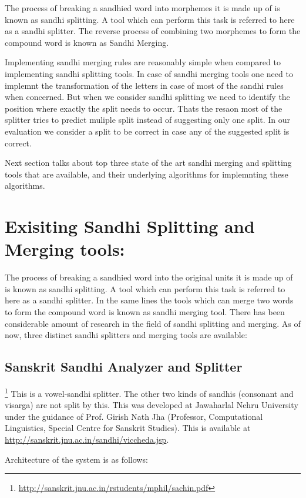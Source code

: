 \documentclass[11pt]{article}
\begin{document}
The process of breaking a sandhied word into morphemes it is made up of is known as sandhi splitting. A tool which can perform this task is referred to here as a sandhi splitter. The reverse process of combining two morphemes to form the compound word is known as Sandhi Merging.

Implementing sandhi merging rules are reasonably simple when compared to implementing sandhi splitting tools. In case of sandhi merging tools one need to implemnt the transformation of the letters in case of most of the sandhi rules when concerned. But when we consider sandhi splitting we need to identify the position where exactly the split needs to occur. Thats the resaon most of the splitter tries to predict muliple split instead of suggesting only one split. In our evaluation we consider a split to be correct in case any of the suggested split is correct.

Next section talks about top three state of the art sandhi merging and splitting tools that are available, and their underlying algorithms for implemnting these algorithms.

\section{Exisiting Sandhi Splitting and Merging tools:}
The process of breaking a sandhied word into the original units it is made up of is known as sandhi splitting. A tool which can perform this task is referred to here as a sandhi splitter.  In the same lines the tools which can merge two words to form the compound word is known as sandhi merging tool. 
There has been considerable amount of research in the field of sandhi splitting and merging. As of now, three distinct sandhi splitters and merging tools are available:



\subsection{Sanskrit Sandhi Analyzer and Splitter}\footnote{\url{http://sanskrit.jnu.ac.in/rstudents/mphil/sachin.pdf}} This is a vowel-sandhi splitter. The other two kinds of sandhis (consonant and visarga) are not split by this. This was developed at Jawaharlal Nehru University under the guidance of Prof. Girish Nath Jha (Professor, Computational Linguistics, Special Centre for Sanskrit Studies). This is available at \url{http://sanskrit.jnu.ac.in/sandhi/viccheda.jsp}.

Architecture of the system is as follows:
\end{document}
